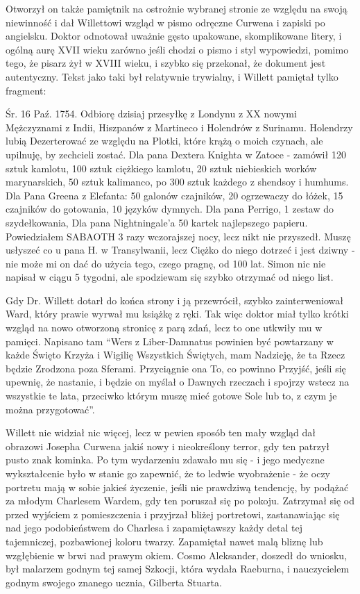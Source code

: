 Otworzył on także pamiętnik na ostrożnie wybranej stronie ze względu na swoją niewinność i dał Willettowi wzgląd w pismo odręczne Curwena i zapiski po angielsku. Doktor odnotował uważnie gęsto upakowane, skomplikowane litery, i ogólną aurę XVII wieku zarówno jeśli chodzi o pismo i styl wypowiedzi, pomimo tego, że pisarz żył w XVIII wieku, i szybko się przekonał, że dokument jest autentyczny. Tekst jako taki był relatywnie trywialny, i Willett pamiętał tylko fragment:

\begin{displayquote}

Śr. 16 Paź. 1754. Odbiorę dzisiaj przesyłkę z Londynu z XX nowymi Mężczyznami z Indii, Hiszpanów z Martineco i Holendrów z Surinamu. Holendrzy lubią Dezerterować ze względu na Plotki, które krążą o moich czynach, ale upilnuję, by zechcieli zostać. Dla pana Dextera Knighta w Zatoce - zamówił 120 sztuk kamlotu, 100 sztuk ciężkiego kamlotu, 20 sztuk niebieskich worków marynarskich, 50 sztuk kalimanco, po 300 sztuk każdego z shendsoy i humhums. Dla Pana Greena z Elefanta: 50 galonów czajników, 20 ogrzewaczy do łóżek, 15 czajników do gotowania, 10 języków dymnych. Dla pana Perrigo, 1 zestaw do szydełkowania, Dla pana Nightningale'a 50 kartek najlepszego papieru. Powiedziałem SABAOTH 3 razy wczorajszej nocy, lecz nikt nie przyszedł. Muszę usłyszeć co u pana H. w Transylwanii, lecz Ciężko do niego dotrzeć i jest dziwny -  nie może mi on dać do użycia tego, czego pragnę, od 100 lat. Simon nic nie napisał w ciągu 5 tygodni, ale spodziewam się szybko otrzymać od niego list. 

\end{displayquote}

Gdy Dr. Willett dotarł do końca strony i ją przewrócił, szybko zainterweniował Ward, który prawie wyrwał mu książkę z ręki. Tak więc doktor miał tylko krótki wzgląd na nowo otworzoną stronicę z parą zdań, lecz to one utkwiły mu w pamięci. Napisano tam ``Wers z Liber-Damnatus powinien być powtarzany w każde Święto Krzyża i Wigilię Wszystkich Świętych, mam Nadzieję, że ta Rzecz będzie Zrodzona poza Sferami. Przyciągnie ona To, co powinno Przyjść, jeśli się upewnię, że nastanie, i będzie on myślał o Dawnych rzeczach i spojrzy wstecz na wszystkie te lata, przeciwko którym muszę mieć gotowe Sole lub to, z czym je można przygotować''.

Willett nie widział nic więcej, lecz w pewien sposób ten mały wzgląd dał obrazowi Josepha Curwena jakiś nowy i nieokreślony terror, gdy ten patrzył pusto znak kominka. Po tym wydarzeniu zdawało mu się - i jego medyczne wykształcenie było w stanie go zapewnić, że to ledwie wyobrażenie - że oczy portretu mają w sobie jakieś życzenie, jeśli nie prawdziwą tendencję, by podążać za młodym Charlesem Wardem, gdy ten poruszał się po pokoju. Zatrzymał się od przed wyjściem z pomieszczenia i przyjrzał bliżej portretowi, zastanawiając się nad jego podobieństwem do Charlesa i zapamiętawszy każdy detal tej tajemniczej, pozbawionej koloru twarzy. Zapamiętał nawet malą bliznę lub wzgłębienie w brwi nad prawym okiem. Cosmo Aleksander, doszedł do wniosku, był malarzem godnym tej samej Szkocji, która wydała Raeburna, i nauczycielem godnym swojego znanego ucznia, Gilberta Stuarta. 

